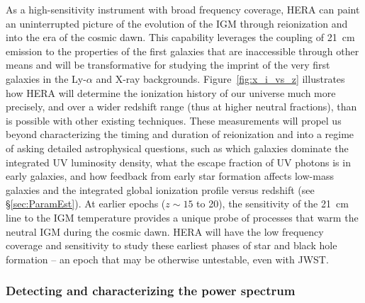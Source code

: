 \documentclass[preprint]{aastex}
\newcommand{\compress}{\vspace{-0.3in}}
\begin{document}
As a high-sensitivity instrument with broad frequency coverage, HERA can
paint an uninterrupted picture of the evolution of the IGM through reionization and into the era of the cosmic dawn.
This capability leverages the coupling of
21~cm emission to the properties of the first galaxies that
are inaccessible through other means  and will be transformative for
studying the imprint of the very first galaxies in the Ly-$\alpha$ and X-ray backgrounds.
Figure~\ref{fig:x_i_vs_z} illustrates how HERA will
determine the ionization history of our universe much more precisely,
and over a wider redshift range (thus at higher neutral fractions), than is possible with other existing techniques.
These measurements will propel us beyond characterizing the timing and duration of reionization and into a regime
of asking detailed astrophysical questions, such as which galaxies dominate the integrated UV luminosity density, what the escape fraction
of UV photons is in early galaxies, and how feedback from early star formation affects low-mass galaxies and
the integrated  global ionization profile versus redshift (see \S\ref{sec:ParamEst}).
At earlier epochs ($z \sim 15$ to 20), the sensitivity of the 21~cm line
to the IGM temperature provides a unique probe of processes that warm the neutral IGM during the cosmic dawn.
HERA will have the low frequency coverage and
sensitivity to study these earliest phases of star and black hole formation -- an epoch that may be otherwise
untestable, even with JWST.

\compress
\subsubsection{Detecting and characterizing the power spectrum}
\label{sec:detectPspec}
\end{document}
